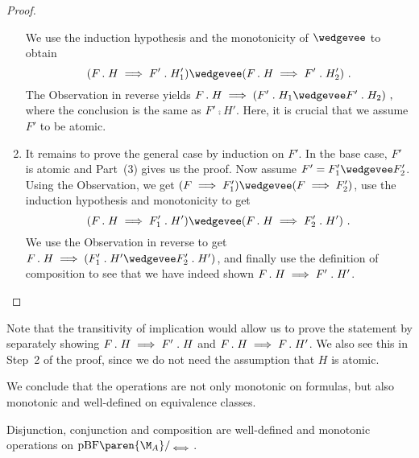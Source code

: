 \documentclass[../../diss.tex]{subfiles}
\begin{document}
\begin{proof}
\begin{enumerate}[(1)]
            We use the induction hypothesis and the monotonicity of $\wedgevee$ to obtain
            \[
                (F \comp H \lleq F' \comp H_1')
                \wedgevee
                (F \comp H \lleq F' \comp H_2')
                \ .
            \]
            The  Observation in reverse yields
            \(
               F \comp H \lleq (F' \comp H_1 \wedgevee F' \comp H_2)
               \ ,
            \)
            where the conclusion is the same as $F' \comp H'$.
            Here, it is crucial that we assume $F'$ to be atomic.
        \item
            It remains to prove the general case by induction on $F'$.
            In the base case, $F'$ is atomic and Part~(3) gives us the proof.
            Now assume $F' = F_1' \wedgevee F_2'$.
            Using the  Observation, we get $(F \lleq F_1') \wedgevee (F \lleq F_2')$, use the induction hypothesis and monotonicity to get
            \[
                (F \comp H \lleq F_1' \comp H')
                \wedgevee
                (F \comp H \lleq F_2' \comp H')
                \ .
            \]
            We use the  Observation in reverse to get $F \comp H \lleq (F_1' \comp H' \wedgevee F_2' \comp H')$, and finally use the definition of composition to see that we have indeed shown $F \mathrel{.} H \implies F' \mathrel{.} H'$.
     \end{enumerate}
     \vspace*{-\baselineskip}
\end{proof}

Note that the transitivity of implication would allow us to prove the statement by separately showing $F \mathrel{.} H \implies F' \mathrel{.} H$ and $F \mathrel{.} H \implies F \mathrel{.} H'$.
We also see this in Step~2 of the proof, since we do not need the assumption that $H$ is atomic.

We conclude that the operations are not only monotonic on formulas, but also monotonic and well-defined on equivalence classes.

\begin{lemma}
    Disjunction, conjunction and composition are well-defined and monotonic operations on $\pBF\paren{\nfatransmonoid{A}}/_{\lequiv}$.
\end{lemma}
\end{document}
